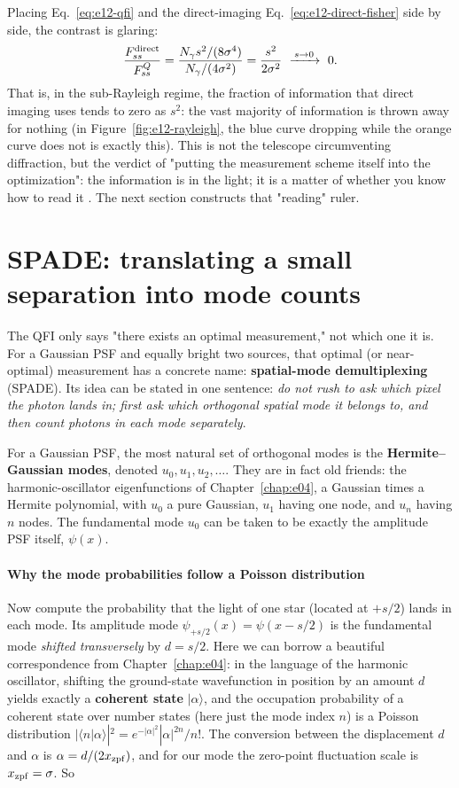 Placing Eq.~\eqref{eq:e12-qfi} and the direct-imaging Eq.~\eqref{eq:e12-direct-fisher} side by side, the contrast is glaring:
\[
  \frac{F_{ss}^{\rm direct}}{F_{ss}^{Q}}
  =\frac{N_\gamma s^2/(8\sigma^4)}{N_\gamma/(4\sigma^2)}
  =\frac{s^2}{2\sigma^2}\ \xrightarrow{\,s\to0\,}\ 0.
\]
That is, in the sub-Rayleigh regime, the fraction of information that direct imaging uses tends to zero as $s^2$: the vast majority of information is thrown away for nothing (in Figure~\ref{fig:e12-rayleigh}, the blue curve dropping while the orange curve does not is exactly this). This is not the telescope circumventing diffraction, but the verdict of "putting the measurement scheme itself into the optimization": the information is in the light; it is a matter of whether you know how to read it \citep{1969JSP.....1..231H,2016PhRvX...6c1033T,2016OExpr..24.3684N}. The next section constructs that "reading" ruler.


\section{SPADE: translating a small separation into mode counts}
\label{sec:e12-spade}

The QFI only says "there exists an optimal measurement," not which one it is. For a Gaussian PSF and equally bright two sources, that optimal (or near-optimal) measurement has a concrete name: \textbf{spatial-mode demultiplexing} (SPADE). Its idea can be stated in one sentence: \emph{do not rush to ask which pixel the photon lands in; first ask which orthogonal spatial mode it belongs to, and then count photons in each mode separately}.

For a Gaussian PSF, the most natural set of orthogonal modes is the \textbf{Hermite--Gaussian modes}, denoted $u_0,u_1,u_2,\dots$. They are in fact old friends: the harmonic-oscillator eigenfunctions of Chapter~\ref{chap:e04}, a Gaussian times a Hermite polynomial, with $u_0$ a pure Gaussian, $u_1$ having one node, and $u_n$ having $n$ nodes. The fundamental mode $u_0$ can be taken to be exactly the amplitude PSF itself, $\psi(x)$.

\paragraph{Why the mode probabilities follow a Poisson distribution}
\label{sec:e12-poisson}

Now compute the probability that the light of one star (located at $+s/2$) lands in each mode. Its amplitude mode $\psi_{+s/2}(x)=\psi(x-s/2)$ is the fundamental mode \emph{shifted transversely} by $d=s/2$. Here we can borrow a beautiful correspondence from Chapter~\ref{chap:e04}: in the language of the harmonic oscillator, shifting the ground-state wavefunction in position by an amount $d$ yields exactly a \textbf{coherent state} $|\alpha\rangle$, and the occupation probability of a coherent state over number states (here just the mode index $n$) is a Poisson distribution $|\langle n|\alpha\rangle|^2=e^{-|\alpha|^2}|\alpha|^{2n}/n!$. The conversion between the displacement $d$ and $\alpha$ is $\alpha=d/(2x_{\rm zpf})$, and for our mode the zero-point fluctuation scale is $x_{\rm zpf}=\sigma$. So

